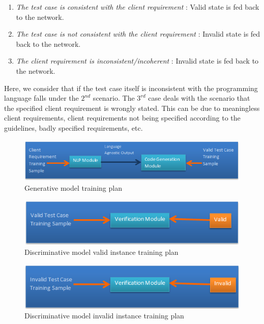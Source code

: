 \documentclass[conference]{IEEEtran}
\begin{document}
\begin{enumerate}
	\item \textit{The test case is consistent with the client requirement} : Valid state is fed back to the network.
	\item  \textit{The test case is not consistent with the client requirement} : Invalid state is fed back to the network.
	\item  \textit{The client requirement is inconsistent/incoherent} : Invalid state is fed back to the network.
\end{enumerate}  

Here, we consider that if the test case itself is inconsistent with the programming language falls under the $2^{nd}$ scenario. The $3^{rd}$ case deals with the scenario that the specified client requirement is wrongly stated. This can be due to meaningless client requirements, client requirements not being specified according to the guidelines, badly specified requirements, etc.

\begin{figure}
	\includegraphics[width=\linewidth]{Generative_model_training.png}
	\caption{Generative model training plan}
	\label{fig10}
\end{figure} 

\begin{figure}
	\includegraphics[width=\linewidth]{Discriminative_model_training.png}
	\caption{Discriminative model valid instance training plan}
	\label{fig11}
\end{figure} 

\begin{figure}
	\includegraphics[width=\linewidth]{Validation_module_negative.png}
	\caption{Discriminative model invalid instance training plan}
	\label{fig12}
\end{figure} 
\end{document}
